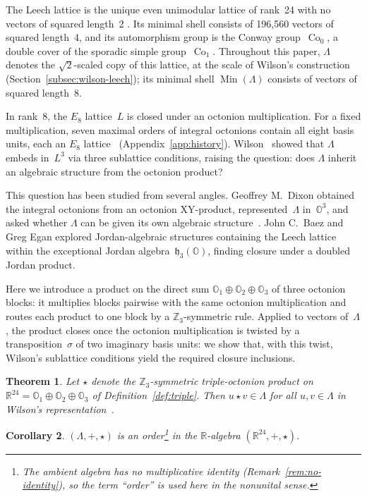\documentclass[twoside,english]{paper}
\numberwithin{equation}{section}
\numberwithin{figure}{section}
\newtheorem{theorem}{Theorem}[section]
\newtheorem{corollary}[theorem]{Corollary}
\theoremstyle{definition}
\theoremstyle{remark}
\newcommand{\OO}{\mathbb{O}}          %
\newcommand{\RR}{\mathbb{R}}
\newcommand{\ZZ}{\mathbb{Z}}
\newcommand{\LL}{\Lambda}             %
\DeclareMathOperator{\Co}{Co}
\begin{document}
The Leech lattice is the unique even unimodular lattice of rank~24
with no vectors of squared length~2 \cite{ConwaySloane1999}.  Its
minimal shell consists of 196{,}560 vectors of squared length~4, and its
automorphism group is the Conway group~$\Co_0$, a double cover of the
sporadic simple group~$\Co_1$.  Throughout this paper, $\LL$ denotes
the $\sqrt{2}$-scaled copy of this lattice, at the scale of Wilson's
construction (Section~\ref{subsec:wilson-leech}); its minimal shell
$\operatorname{Min}(\LL)$ consists of vectors of squared length~8.

In rank~8, the $E_8$ lattice~$L$ is closed under an octonion
multiplication.  For a fixed multiplication, seven maximal orders of
integral octonions contain all eight basis units, each an $E_8$
lattice~\cite{Coxeter1946, ConwaySmith2003} (Appendix~\ref{app:history}).
Wilson~\cite[Sections~3--4]{Wilson2009} showed that $\LL$ embeds in~$L^3$ via
three sublattice conditions, raising the question: does
$\LL$ inherit an algebraic structure from the octonion product?

This question has been studied from several angles.  Geoffrey
M.~Dixon \cite{Dixon2010} obtained the integral octonions from an
octonion XY-product, represented~$\LL$ in~$\OO^3$, and asked whether
$\LL$ can be given its own algebraic structure~\cite[Section~7]{Dixon2010}.
John C.~Baez and Greg Egan \cite{Baez2014} explored
Jordan-algebraic structures containing the Leech lattice within the exceptional Jordan
algebra~$\mathfrak{h}_3(\OO)$, finding closure under a doubled
Jordan product.

Here we introduce a product on the direct sum
$\OO_1 \oplus \OO_2 \oplus \OO_3$ of three octonion blocks: it
multiplies blocks pairwise with the same octonion multiplication and
routes each product to one block by a $\ZZ_3$-symmetric rule.  Applied
to vectors of~$\LL$, the product closes once the octonion
multiplication is twisted by a transposition~$\sigma$ of two imaginary
basis units: we show that, with this twist, Wilson's sublattice
conditions yield the required closure inclusions.

\begin{theorem}\label{thm:main}
Let\/ $\star$ denote the $\ZZ_3$-symmetric triple-octonion product
on~$\RR^{24} = \OO_1 \oplus \OO_2 \oplus \OO_3$ of
Definition~\ref{def:triple}.  Then $u \star v \in \LL$ for all
$u, v \in \LL$ in Wilson's representation~\cite{Wilson2009}.
\end{theorem}

\begin{corollary}\label{cor:order}
$(\LL, +, \star)$ is an order\footnote{The ambient algebra has no
multiplicative identity (Remark~\ref{rem:no-identity}), so the term
``order'' is used here in the nonunital sense.} in the $\RR$-algebra
$(\RR^{24}, +, \star)$.
\end{corollary}
\end{document}
